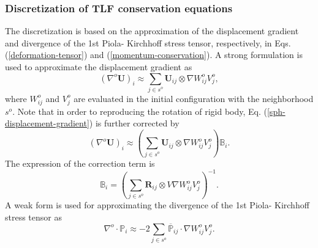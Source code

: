 \documentclass[12pt, a4paper,onecolumn]{article}
\begin{document}
\subsubsection{Discretization of TLF conservation equations}
The discretization is based on the approximation of 
the displacement gradient and divergence of the 1st Piola- Kirchhoff stress tensor, 
respectively, in Eqs. (\ref{deformation-tensor})  and (\ref{momentum-conservation}). 
A strong formulation is used to approximate the displacement gradient as 
%
\begin{equation}\label{sph-displacement-gradient}
\left(\nabla^{o} \mathbf{U}\right)_i \approx  \sum_{j\in s^{o}}  \mathbf{U}_{ij} \otimes  \nabla W^{o}_{ij} V^{o}_j,
\end{equation}
%
where $W^{o}_{ij}$ and $V^{o}_j$ are evaluated in the initial configuration with the neighborhood $s^{o}$.
Note that in order to reproducing the rotation of rigid body, 
Eq. (\ref{sph-displacement-gradient}) is further corrected by
%
\begin{equation}\label{sph-displacement-gradient-corrected}
\left(\nabla^{o} \mathbf{U}\right)_i \approx   \left(\sum_{j\in s^{o}} \mathbf{U}_{ij} \otimes  \nabla W^{o}_{ij}V^{o}_j\right)\mathbb{B}_i.
\end{equation}
%
The expression of the correction term is 
%
\begin{equation}\label{sph-gradient-correction}
\mathbb{B}_i =  \left(\sum_{j\in s^{o}} \mathbf{R}_{ij} \otimes V\nabla W^{o}_{ij}V^{o}_j \right)^{-1}.
\end{equation}
%
A weak form is used for approximating the divergence of the 1st Piola- Kirchhoff stress tensor as
\begin{equation}
\label{eq:surface-integral-TFL}
\nabla^{o} \cdot \mathbb{P}_i \approx 
-2 \sum_{j\in s^{o}}  \overline{\mathbb{P}}_{ij} \cdot \nabla W^{o}_{ij} V^{o}_j.
\end{equation}
%
\end{document}

